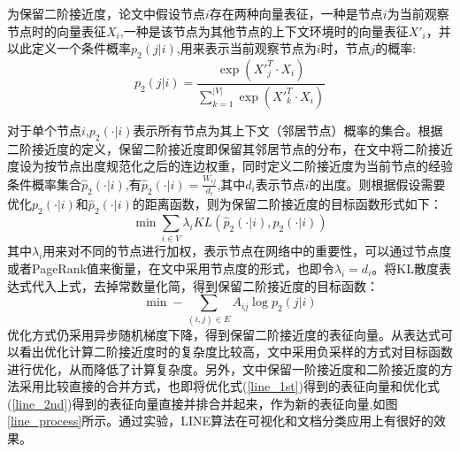  为保留二阶接近度，论文中假设节点$i$存在两种向量表征，一种是节点$i$为当前观察节点时的向量表征$X_i$,一种是该节点为其他节点的上下文环境时的向量表征$X'_i$，并以此定义一个条件概率$p_2(j|i)$,用来表示当前观察节点为$i$时，节点$j$的概率:
 \begin{equation}
 	p_2(j|i) = \frac{\exp(X\prime_j^T \cdot X_i)}{\sum_{k=1}^{|V|}\exp(X\prime_k^T \cdot X_i)}
 \end{equation}
 
 对于单个节点$i$,$p_2(\cdot|i)$表示所有节点为其上下文（邻居节点）概率的集合。根据二阶接近度的定义，保留二阶接近度即保留其邻居节点的分布，在文中将二阶接近度设为按节点出度规范化之后的连边权重，同时定义二阶接近度为当前节点的经验条件概率集合$\hat{p}_2(\cdot|i)$,有$\hat{p}_2(\cdot|i) = \frac{W_{ij}}{d_i}$,其中$d_i$表示节点$i$的出度。则根据假设需要优化$p_2(\cdot|i)$和$\hat{p}_2(\cdot|i)$的距离函数，则为保留二阶接近度的目标函数形式如下：
 \begin{equation}
 \min \sum_{i \in V}\lambda_i KL(\hat{p}_2(\cdot|i),p_2(\cdot|i))
 \end{equation}
 其中$\lambda_i$用来对不同的节点进行加权，表示节点在网络中的重要性，可以通过节点度或者PageRank\cite{page1999pagerank}值来衡量，在文中采用节点度的形式，也即令$\lambda_i=d_i$。将KL散度表达式代入上式，去掉常数量化简，得到保留二阶接近度的目标函数：
 \begin{equation}\label{line_2nd}
 \min -\sum_{(i,j) \in E} A_{ij}\log p_2(j|i)
 \end{equation}
 优化方式仍采用异步随机梯度下降，得到保留二阶接近度的表征向量。从表达式可以看出优化计算二阶接近度时的复杂度比较高，文中采用负采样的方式对目标函数进行优化，从而降低了计算复杂度。另外，文中保留一阶接近度和二阶接近度的方法采用比较直接的合并方式，也即将优化式(\ref{line_1st})得到的表征向量和优化式(\ref{line_2nd})得到的表征向量直接并排合并起来，作为新的表征向量,如图\ref{line_process}所示。通过实验，LINE算法在可视化和文档分类应用上有很好的效果。


